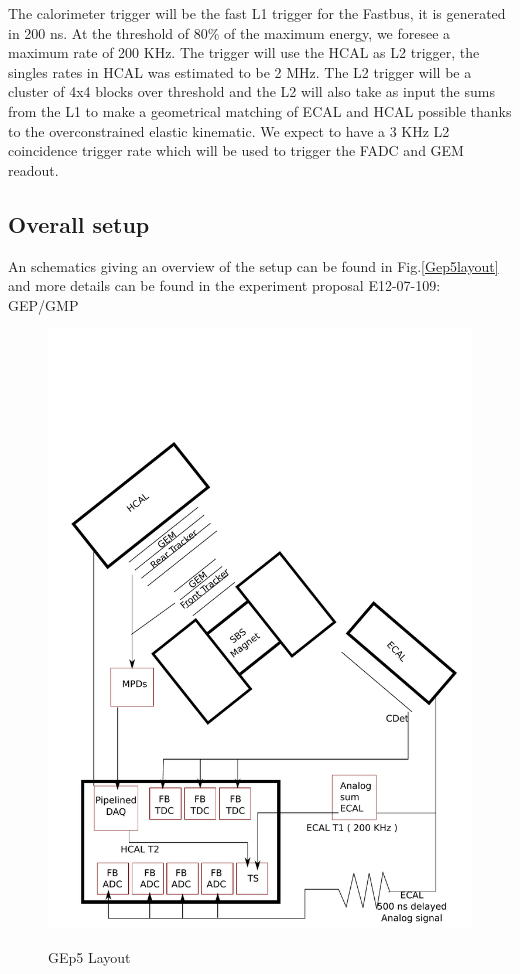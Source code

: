 \documentclass{article}
\begin{document}
The calorimeter trigger will be the fast L1 trigger for the Fastbus, it is generated in 200 ns. At the threshold of 80\% of the maximum energy, we foresee a maximum rate of 200 KHz.
The trigger will use the HCAL as L2 trigger, the singles rates in HCAL was estimated to be 2 MHz. The L2 trigger will be a cluster of 4x4 blocks over threshold and the L2 will also take as input the sums from the L1 to make a geometrical matching of ECAL and HCAL possible thanks to the overconstrained elastic kinematic. We expect to have a 3 KHz L2 coincidence trigger rate which will be used to trigger the FADC and GEM readout. 

\subsection {Overall setup}
An schematics giving an overview of the setup can be found in Fig.\ref{Gep5layout} and more details can be found in the experiment proposal E12-07-109: GEP/GMP \cite{GEpProp}
\begin{figure}
\includegraphics[scale=0.55]{figs/Gep5layout.pdf}\\
  \caption{GEp5 Layout}\label{fig:Gep5layout}

\end{figure}
\end{document}

